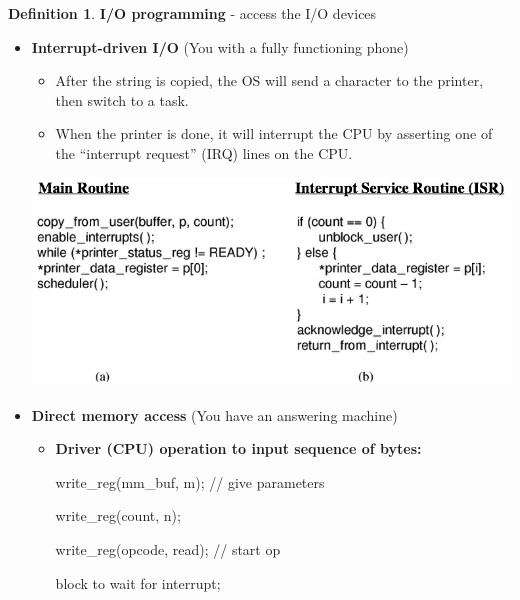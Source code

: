 \documentclass[11pt,a4paper]{article}
\theoremstyle{definition}
\newtheorem{definition}{Definition}[section]
\newenvironment{myitemize}
{ \begin{itemize}
    \setlength{\itemsep}{5pt}
    \setlength{\parskip}{0pt}
    \setlength{\parsep}{0pt}     }
{ \end{itemize}                  }
\begin{document}
\begin{definition}{\textbf{I/O programming} - access the I/O devices}
\begin{myitemize}
		\textbf{Issue}: It takes perhaps 10ms to print a character. During this time, the CPU will be busy-waiting until the printer is done printing. On a 3.2 GHz processor this is equivalent to wasting 320,000,000 instructions! 


		\item \textbf{Interrupt-driven I/O} (You with a fully functioning phone)

		\begin{minipage}{0.35\linewidth}
		\begin{myitemize}
			\item After the string is copied, the OS will send a character to the printer, then switch to a task.
			\item When the printer is done, it will interrupt the CPU by asserting one of the “interrupt request” (IRQ) lines on the CPU.
		\end{myitemize}
		\end{minipage}\hspace{5mm}
		\begin{minipage}{0.6\linewidth}
			\includegraphics[width=\linewidth]{m3/InterruptIO}
		\end{minipage}
		\item \textbf{Direct memory access} (You have an answering machine)
		\begin{myitemize}
			\item \textbf{Driver (CPU) operation to input sequence of bytes:}
			\begin{tcolorbox}
			
				write\_reg(mm\_buf, m);     // give parameters
			
			write\_reg(count, n);
			
			write\_reg(opcode, read);  // start op
			
			block to wait for interrupt;


\end{tcolorbox}
\end{myitemize}
\end{myitemize}
\end{definition}
\end{document}
